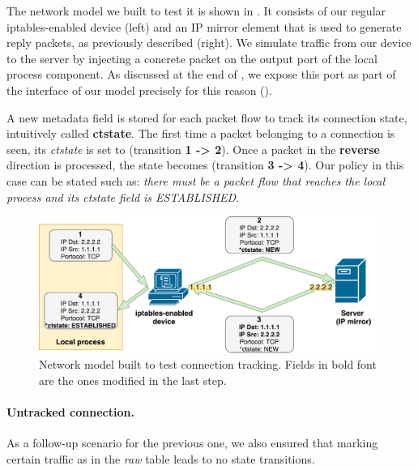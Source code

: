 The network model we built to test it is shown in
.  It consists of our regular
iptables-enabled device (left) and an IP mirror element that is used to
generate reply packets, as previously described (right).  We simulate traffic
from our device to the server by injecting a concrete packet on the output port
of the local process component.  As discussed at the end of
, we expose this port as part of the
interface of our model precisely for this reason
().

A new metadata field is stored for each packet flow to track its connection
state, intuitively called \textbf{ctstate}.  The first time a packet belonging
to a connection is seen, its \emph{ctstate} is set to \NEW (transition
\textbf{1 -> 2}).  Once a packet in the \textbf{reverse} direction is
processed, the state becomes \ESTABLISHED (transition \textbf{3 -> 4}).  Our
policy in this case can be stated such as: \emph{there must be a packet flow
that reaches the local process and its ctstate field is ESTABLISHED}.

\begin{figure}[h]
  \centering
  \captionsetup{justification=centering}
  \includegraphics[scale=0.5]{src/img/state-switch}
  \caption[Network model built to test connection tracking.]{Network model
  built to test connection tracking. Fields in bold font are the ones modified
  in the last step.}
  \label{fig:state-switch}
\end{figure}

\paragraph{Untracked connection.}
As a follow-up scenario for the previous one, we also ensured that marking
certain traffic as \UNTRACKED in the \emph{raw} table leads to no state
transitions.

\bigskip

